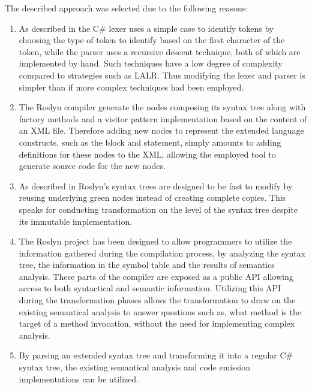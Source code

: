 The described approach was selected due to the following reasons:
\begin{enumerate}
\item As described in  the C\# lexer  uses a simple  case to identify tokens by choosing the type of token to identify based on the first character of the token, while the parser uses a recursive descent technique, both of which are implemented by hand. Such techniques have a low degree of complexity compared to strategies such as \ac{LALR}. Thus modifying the lexer and parser is simpler than if more complex techniques had been employed.

\item The Roslyn compiler generate the nodes composing its syntax tree along with factory methods and a visitor pattern implementation based on the content of an \ac{XML} file. Therefore adding new nodes to represent the extended language constructs, such as the  block and  statement, simply amounts to adding definitions for these nodes to the \ac{XML}, allowing the employed tool to generate source code for the new nodes. 

\item As described in  Roslyn's syntax trees are designed to be fast to modify by reusing underlying green nodes instead of creating complete copies\cite[p. 6]{ng2012roslyn}. This speaks for conducting transformation on the level of the syntax tree despite its immutable implementation.

\item The Roslyn project has been designed to allow programmers to utilize the information gathered during the compilation process, by analyzing the syntax tree, the information in the symbol table and the results of semantics analysis. These parts of the compiler are exposed as a public \ac{API} allowing access to both syntactical and semantic information. Utilizing this \ac{API} during the transformation phases allows the transformation to draw on the existing semantical analysis to answer questions such as, what method is the target of a method invocation, without the need for implementing complex analysis.

\item By parsing an extended syntax tree and transforming it into a regular C\# syntax tree, the existing semantical analysis and code emission implementations can be utilized.
\end{enumerate}

